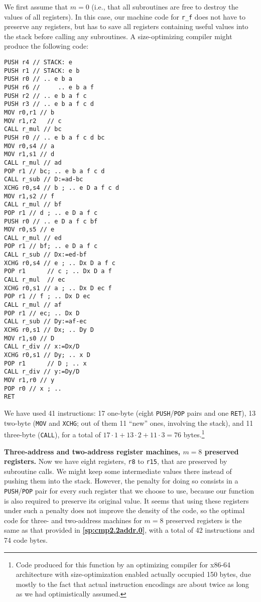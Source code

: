 \documentclass[12pt,oneside]{article}
\def\makepoint#1{\medbreak\noindent{\bf #1.\ }}
\def\nxsubpoint{\refstepcounter{subsubsection}%
    \smallbreak\makepoint{\thesubsubsection}}
\def\refpoint#1{{\rm\textbf{\ref{#1}}}}
\let\ptref=\refpoint
\def\emb#1{\textbf{#1.}}
\begin{document}
We first assume that $m=0$ (i.e., that all subroutines are free to destroy the values of all registers). In this case, our machine code for \texttt{r\_f} does not have to preserve any registers, but has to save all registers containing useful values into the stack before calling any subroutines. A size-optimizing compiler might produce the following code:
\begin{verbatim}
PUSH r4 // STACK: e
PUSH r1 // STACK: e b
PUSH r0 // .. e b a
PUSH r6 //     .. e b a f
PUSH r2 // .. e b a f c
PUSH r3 // .. e b a f c d
MOV r0,r1 // b
MOV r1,r2   // c
CALL r_mul // bc
PUSH r0 // .. e b a f c d bc
MOV r0,s4 // a
MOV r1,s1 // d
CALL r_mul // ad
POP r1 // bc; .. e b a f c d
CALL r_sub // D:=ad-bc
XCHG r0,s4 // b ; .. e D a f c d
MOV r1,s2 // f
CALL r_mul // bf
POP r1 // d ; .. e D a f c
PUSH r0 // .. e D a f c bf
MOV r0,s5 // e
CALL r_mul // ed
POP r1 // bf; .. e D a f c
CALL r_sub // Dx:=ed-bf
XCHG r0,s4 // e ; .. Dx D a f c
POP r1      // c ; .. Dx D a f
CALL r_mul  // ec
XCHG r0,s1 // a ; .. Dx D ec f
POP r1 // f ; .. Dx D ec
CALL r_mul // af
POP r1 // ec; .. Dx D
CALL r_sub // Dy:=af-ec
XCHG r0,s1 // Dx; .. Dy D
MOV r1,s0 // D
CALL r_div // x:=Dx/D
XCHG r0,s1 // Dy; .. x D
POP r1      // D ; .. x
CALL r_div // y:=Dy/D
MOV r1,r0 // y
POP r0 // x ; ..
RET
\end{verbatim}
We have used 41 instructions: 17 one-byte (eight \texttt{PUSH}/\texttt{POP} pairs and one \texttt{RET}), 13 two-byte (\texttt{MOV} and \texttt{XCHG}; out of them 11 ``new'' ones, involving the stack), and 11 three-byte (\texttt{CALL}), for a total of $17\cdot1+13\cdot2+11\cdot3=76$ bytes.\footnote{Code produced for this function by an optimizing compiler for x86-64 architecture with size-optimization enabled actually occupied 150 bytes, due mostly to the fact that actual instruction encodings are about twice as long as we had optimistically assumed.}

\nxsubpoint\label{sp:cmp2.2addr.8}\emb{Three-address and two-address register machines, $m=8$ preserved registers}
Now we have eight registers, \texttt{r8} to \texttt{r15}, that are preserved by subroutine calls. We might keep some intermediate values there instead of pushing them into the stack. However, the penalty for doing so consists in a \texttt{PUSH}/\texttt{POP} pair for every such register that we choose to use, because our function is also required to preserve its original value. It seems that using these registers under such a penalty does not improve the density of the code, so the optimal code for three- and two-address machines for $m=8$ preserved registers is the same as that provided in \ptref{sp:cmp2.2addr.0}, with a total of 42 instructions and 74 code bytes.
\end{document}
